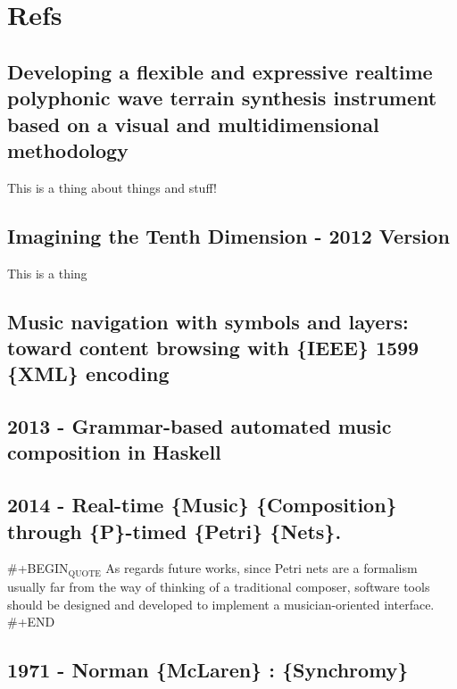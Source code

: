 \documentclass[11pt]{article}
\begin{document}
\section{Refs}
\label{sec:org9e9fa25}
\subsection{Developing a flexible and expressive realtime polyphonic wave terrain synthesis instrument based on a visual and multidimensional methodology}
\label{sec:orgf68873e}
This is a thing about things and stuff! \citeyear{james_developing_2005}

\subsection{Imagining the Tenth Dimension - 2012 Version}
\label{sec:orgcf88550}
\cite{10thdim_imagining_2012}

This is a thing

\subsection{Music navigation with symbols and layers: toward content browsing with \{IEEE\} 1599 \{XML\} encoding}
\label{sec:org3c36ba8}
\cite{baggi_music_2013}


\subsection{2013 - Grammar-based automated music composition in Haskell}
\label{sec:org1e7619f}

\subsection{2014 - Real-time \{Music\} \{Composition\} through \{P\}-timed \{Petri\} \{Nets\}.}
\label{sec:orgac2d8e7}
\cite{barate_real-time_2014}

\#+BEGIN\(_{\text{QUOTE}}\)
As regards future works, since Petri nets are a formalism
usually far from the way of thinking of a traditional composer,
software tools should be designed and developed to
implement a musician-oriented interface. 
\#+END


\subsection{1971 - Norman \{McLaren\} : \{Synchromy\}}
\label{sec:org5830a4f}
\cite{anathemecollection_norman_1971}
\end{document}
